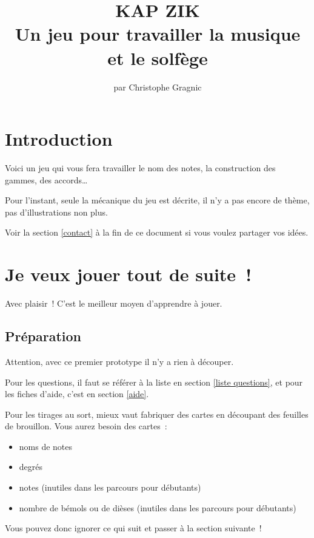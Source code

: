 \documentclass[11pt]{article}
\title{\vspace{-5em}
KAP ZIK \\
\vspace{1em}
Un jeu pour travailler la musique et le solfège}
\author{par Christophe Gragnic}
\date{}
\begin{document}
\maketitle

\setcounter{tocdepth}{2}
\tableofcontents

\section{Introduction}

Voici un jeu qui vous fera travailler le nom des notes, la construction des
gammes, des accords…

Pour l’instant, seule la mécanique du jeu est décrite, il n’y a pas encore de
thème, pas d’illustrations non plus.

Voir la section \ref{contact} à la fin de ce document si vous voulez partager
vos idées.

\newpage

\section{Je veux jouer tout de suite !}

Avec plaisir ! C’est le meilleur moyen d’apprendre à jouer.

\subsection{Préparation}

Attention, avec ce premier prototype il n’y a rien à découper.

Pour les questions, il faut se référer à la liste en section
\ref{liste questions}, et pour les fiches d’aide, c’est en section
\ref{aide}.

Pour les tirages au sort, mieux vaut fabriquer des cartes en découpant des
feuilles de brouillon. Vous aurez besoin des cartes :

\begin{itemize}
\item noms de notes
\item degrés
\item notes (inutiles dans les parcours pour débutants)
\item nombre de bémols ou de dièses (inutiles dans les parcours pour débutants)
\end{itemize}

Vous pouvez donc ignorer ce qui suit et passer à la section suivante !
\end{document}
